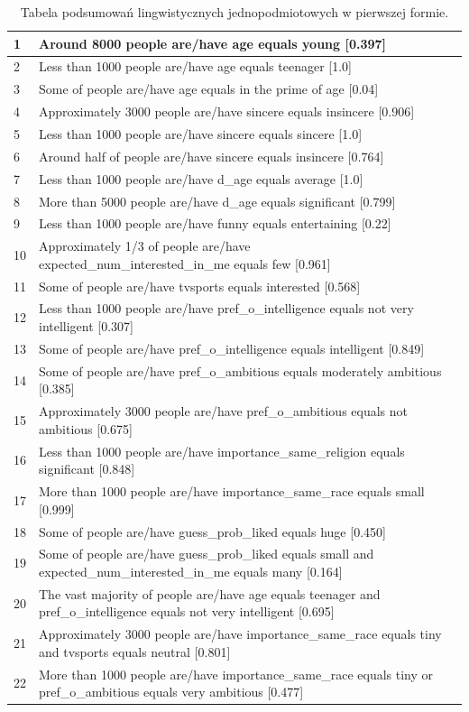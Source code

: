 \documentclass{classrep}
\begin{document}
\begin{center}
\begin{table}[H]
\begin{tabularx}{\textwidth}{lXc}
    1 & Around 8000 people are/have age equals young [0.397] \\ \hline
    2 & Less than 1000 people are/have age equals teenager [1.0]\\ \hline
    3 & Some of people are/have age equals in the prime of age [0.04] \\ \hline
    4 & Approximately 3000 people are/have sincere equals insincere [0.906] \\ \hline
    5 & Less than 1000 people are/have sincere equals sincere [1.0] \\ \hline
    6 & Around half of people are/have sincere equals insincere [0.764]\\ \hline
    7 & Less than 1000 people are/have d\_age equals average [1.0] \\ \hline 
    8 & More than 5000 people are/have d\_age equals significant [0.799]\\ \hline 
    9 & Less than 1000 people are/have funny equals entertaining [0.22]\\ \hline 
    10 & Approximately 1/3 of people are/have expected\_num\_interested\_in\_me equals few [0.961] \\ \hline
    11 & Some of people are/have tvsports equals interested [0.568] \\ \hline
    12 & Less than 1000 people are/have pref\_o\_intelligence equals not very intelligent [0.307]\\ \hline
    13 & Some of people are/have pref\_o\_intelligence equals intelligent [0.849] \\ \hline
    14 & Some of people are/have pref\_o\_ambitious equals moderately ambitious [0.385] \\ \hline
    15 & Approximately 3000 people are/have pref\_o\_ambitious equals not ambitious [0.675]\\ \hline
    16 & Less than 1000 people are/have importance\_same\_religion equals significant [0.848] \\ \hline
    17 & More than 1000 people are/have importance\_same\_race equals small [0.999] \\ \hline
    18 & Some of people are/have guess\_prob\_liked equals huge [0.450] \\ \hline
    19 & Some of people are/have guess\_prob\_liked equals small and expected\_num\_interested\_in\_me equals many [0.164]\\ \hline
    20 & The vast majority of people are/have age equals teenager and pref\_o\_intelligence equals not very intelligent [0.695]\\ \hline
    21 & Approximately 3000 people are/have importance\_same\_race equals tiny and tvsports equals neutral [0.801]\\ \hline
    22 & More than 1000 people are/have importance\_same\_race equals tiny or pref\_o\_ambitious equals very ambitious [0.477]\\ \hline
  \end{tabularx}
  \caption{Tabela podsumowań lingwistycznych jednopodmiotowych w pierwszej formie.}
\end{table}
\end{center}
\end{document}
